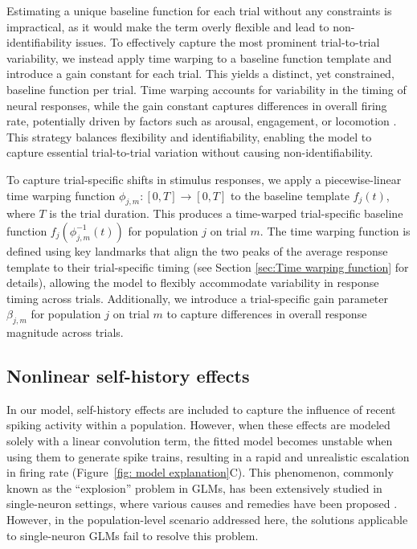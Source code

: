 \documentclass[12pt]{article}
\begin{document}
Estimating a unique baseline function for each trial without any constraints is impractical, as it would make the term overly flexible and lead to non-identifiability issues. To effectively capture the most prominent trial-to-trial variability, we instead apply time warping to a baseline function template and introduce a gain constant for each trial. This yields a distinct, yet constrained, baseline function per trial. Time warping accounts for variability in the timing of neural responses, while the gain constant captures differences in overall firing rate, potentially driven by factors such as arousal, engagement, or locomotion \cite{niell2010modulation, vinck2015arousal, yin2023engaged}. This strategy balances flexibility and identifiability, enabling the model to capture essential trial-to-trial variation without causing non-identifiability.

To capture trial-specific shifts in stimulus responses, we apply a piecewise-linear time warping function $\phi_{j,m}: [0, T] \rightarrow [0, T]$ to the baseline template $f_j(t)$, where $T$ is the trial duration. This produces a time-warped trial-specific baseline function $f_j(\phi^{-1}_{j,m}(t))$ for population $j$ on trial $m$. The time warping function is defined using key landmarks that align the two peaks of the average response template to their trial-specific timing (see Section \ref{sec:Time warping function} for details), allowing the model to flexibly accommodate variability in response timing across trials. Additionally, we introduce a trial-specific gain parameter $\beta_{j,m}$ for population $j$ on trial $m$ to capture differences in overall response magnitude across trials.

\subsection{Nonlinear self-history effects}
\label{sec:Nonlinear self-history effects}

In our model, self-history effects are included to capture the influence of recent spiking activity within a population. However, when these effects are modeled solely with a linear convolution term, the fitted model becomes unstable when using them to generate spike trains, resulting in a rapid and unrealistic escalation in firing rate (Figure~\ref{fig: model explanation}C). This phenomenon, commonly known as the ``explosion'' problem in GLMs, has been extensively studied in single-neuron settings, where various causes and remedies have been proposed \citep{chen2019stability}. However, in the population-level scenario addressed here, the solutions applicable to single-neuron GLMs fail to resolve this problem.
\end{document}
